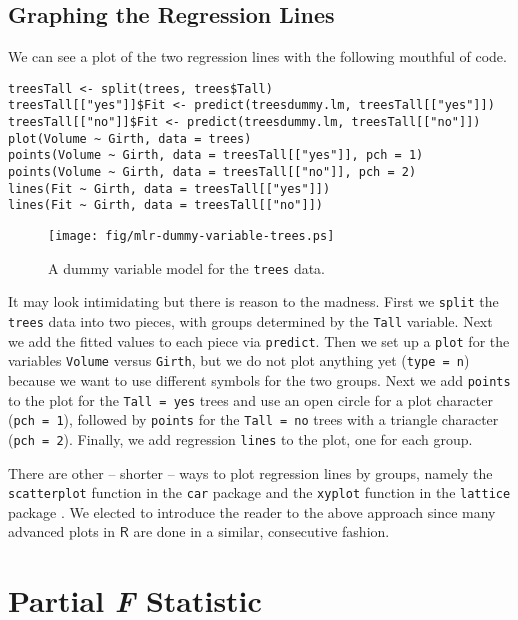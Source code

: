 \subsection{Graphing the Regression Lines}
\label{sec-12-4-3}

We can see a plot of the two regression lines with the following
mouthful of code.

\begin{verbatim}
treesTall <- split(trees, trees$Tall)
treesTall[["yes"]]$Fit <- predict(treesdummy.lm, treesTall[["yes"]])
treesTall[["no"]]$Fit <- predict(treesdummy.lm, treesTall[["no"]])
plot(Volume ~ Girth, data = trees)
points(Volume ~ Girth, data = treesTall[["yes"]], pch = 1)
points(Volume ~ Girth, data = treesTall[["no"]], pch = 2)
lines(Fit ~ Girth, data = treesTall[["yes"]])
lines(Fit ~ Girth, data = treesTall[["no"]])
\end{verbatim}

\begin{figure}[ht!]
\centering
\texttt{[image: fig/mlr-dummy-variable-trees.ps]}
\caption[A dummy variable model for the \texttt{trees} data]{\label{fig-dummy-variable-trees}\small A dummy variable model for the \texttt{trees} data.}
\end{figure}

It may look intimidating but there is reason to the madness. First we
\texttt{split} the \texttt{trees} data into two pieces, with groups determined by
the \texttt{Tall} variable. Next we add the fitted values to each piece via
\texttt{predict}. Then we set up a \texttt{plot} for the variables \texttt{Volume} versus
\texttt{Girth}, but we do not plot anything yet (\texttt{type = n}) because we want
to use different symbols for the two groups. Next we add \texttt{points} to
the plot for the \texttt{Tall = yes} trees and use an open circle for a plot
character (\texttt{pch = 1}), followed by \texttt{points} for the \texttt{Tall = no} trees
with a triangle character (\texttt{pch = 2}). Finally, we add regression
\texttt{lines} to the plot, one for each group.

There are other -- shorter -- ways to plot regression lines by groups,
namely the \texttt{scatterplot} function in the \texttt{car} package \cite{car} and
the \texttt{xyplot} function in the \texttt{lattice} package \cite{lattice}. We
elected to introduce the reader to the above approach since many
advanced plots in \(\mathsf{R}\) are done in a similar, consecutive
fashion.

\section{Partial \emph{F} Statistic}
\label{sec-12-5}

